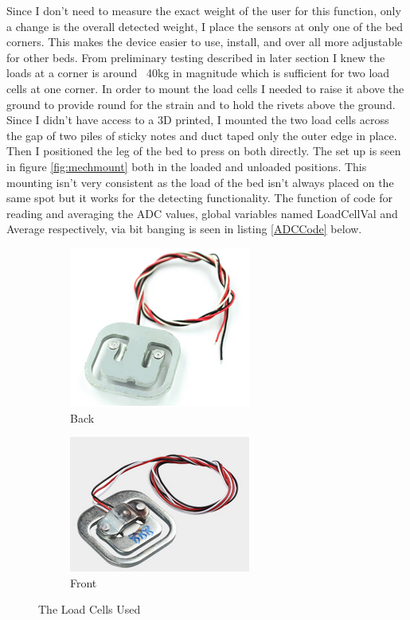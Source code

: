 \documentclass[11pt]{article}
\begin{document}
Since I don't need to measure the exact weight of the user for this function, only a change is the overall detected weight, I place the sensors at only one  of the bed corners. 
This makes the device easier to use, install, and over all more adjustable for other beds.
From preliminary testing described in later section I knew the loads at a corner is around ~40kg in magnitude which is sufficient for two load cells at one corner.
In order to mount the load cells I needed to raise it above the ground to provide round for the strain and to hold the rivets above the ground.
Since I didn't have access to a 3D printed, I mounted the two load cells across the gap of two piles of sticky notes and duct taped only the outer edge in place.
Then I positioned the leg of the bed to press on both directly.
The set up is seen in figure \ref{fig:mechmount} both in the loaded and unloaded positions.
This mounting isn't very consistent as the load of the bed isn't always placed on the same spot but it works for the detecting functionality. 
The function of code for reading and averaging the ADC values, global variables named LoadCellVal and Average respectively, via bit banging is seen in listing \ref{ADCCode} below.    \\
\begin{figure}[H]
	\centering
	\begin{subfigure}[]{0.3\textwidth}
		\centering
		\includegraphics{loadcellback}
		\caption{Back}
	\end{subfigure}
	\begin{subfigure}[]{0.3\textwidth}
		\centering
		\includegraphics{loadcellfront}
		\caption{Front}
	\end{subfigure}
	\caption{The Load Cells Used}
	\label{fig:loadcellproduct}
\end{figure}
\end{document}
